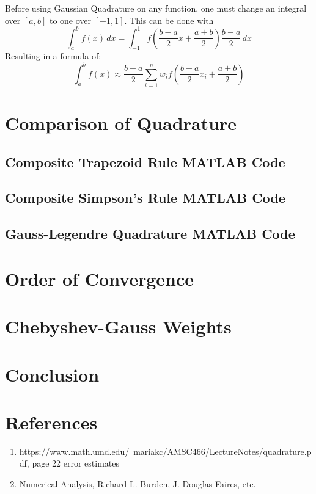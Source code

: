 \documentclass[12pt]{article}
\begin{document}
Before using Gaussian Quadrature on any function, one must change an integral over $[a,b]$ to one over $[-1,1]$. This can be done with
\begin{equation*}
	\int_{a}^{b} f(x) \,dx = \int_{-1}^{1}f \left(\frac{b-a}{2}x+\frac{a+b}{2}\right)\frac{b-a}{2} \,dx
\end{equation*}
Resulting in a formula of:
\begin{equation}
	\int_{a}^{b}f(x) \approx \frac{b-a}{2}\sum_{i=1}^{n}w_{i}f \left(\frac{b-a}{2}x_{i}+\frac{a+b}{2} \right)
\end{equation}

\section{Comparison of Quadrature}

\subsection{Composite Trapezoid Rule MATLAB Code}



\subsection{Composite Simpson's Rule MATLAB Code}



\subsection{Gauss-Legendre Quadrature MATLAB Code}




\section{Order of Convergence}

\section{Chebyshev-Gauss Weights}

\section{Conclusion}

\newpage
\section{References}

\begin{enumerate}
    \item https://www.math.umd.edu/~mariakc/AMSC466/LectureNotes/quadrature.pdf, page 22 error estimates
    \item Numerical Analysis, Richard L. Burden, J. Douglas Faires, etc.
\end{enumerate}
\end{document}
